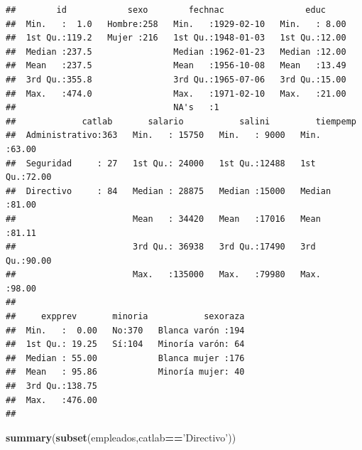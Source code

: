 \documentclass[]{book}
\newenvironment{Shaded}{\begin{snugshade}}{\end{snugshade}}
\newcommand{\KeywordTok}[1]{\textcolor[rgb]{0.13,0.29,0.53}{\textbf{#1}}}
\newcommand{\StringTok}[1]{\textcolor[rgb]{0.31,0.60,0.02}{#1}}
\newcommand{\OperatorTok}[1]{\textcolor[rgb]{0.81,0.36,0.00}{\textbf{#1}}}
\newcommand{\NormalTok}[1]{#1}
\begin{document}
\begin{verbatim}
##        id            sexo        fechnac                educ      
##  Min.   :  1.0   Hombre:258   Min.   :1929-02-10   Min.   : 8.00  
##  1st Qu.:119.2   Mujer :216   1st Qu.:1948-01-03   1st Qu.:12.00  
##  Median :237.5                Median :1962-01-23   Median :12.00  
##  Mean   :237.5                Mean   :1956-10-08   Mean   :13.49  
##  3rd Qu.:355.8                3rd Qu.:1965-07-06   3rd Qu.:15.00  
##  Max.   :474.0                Max.   :1971-02-10   Max.   :21.00  
##                               NA's   :1                           
##             catlab       salario           salini         tiempemp    
##  Administrativo:363   Min.   : 15750   Min.   : 9000   Min.   :63.00  
##  Seguridad     : 27   1st Qu.: 24000   1st Qu.:12488   1st Qu.:72.00  
##  Directivo     : 84   Median : 28875   Median :15000   Median :81.00  
##                       Mean   : 34420   Mean   :17016   Mean   :81.11  
##                       3rd Qu.: 36938   3rd Qu.:17490   3rd Qu.:90.00  
##                       Max.   :135000   Max.   :79980   Max.   :98.00  
##                                                                       
##     expprev       minoria           sexoraza  
##  Min.   :  0.00   No:370   Blanca varón :194  
##  1st Qu.: 19.25   Sí:104   Minoría varón: 64  
##  Median : 55.00            Blanca mujer :176  
##  Mean   : 95.86            Minoría mujer: 40  
##  3rd Qu.:138.75                               
##  Max.   :476.00                               
## 
\end{verbatim}

\begin{Shaded}
\begin{Highlighting}[]
\KeywordTok{summary}\NormalTok{(}\KeywordTok{subset}\NormalTok{(empleados,catlab}\OperatorTok{==}\StringTok{'Directivo'}\NormalTok{))}
\end{Highlighting}
\end{Shaded}
\end{document}
